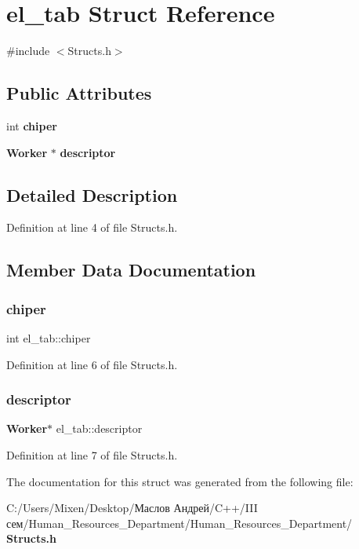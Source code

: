 \section{el\+\_\+tab Struct Reference}
\label{structel__tab}


{\ttfamily \#include $<$Structs.\+h$>$}

\subsection*{Public Attributes}
\begin{DoxyCompactItemize}
\item 
int \textbf{ chiper}
\item 
\textbf{ Worker} $\ast$ \textbf{ descriptor}
\end{DoxyCompactItemize}


\subsection{Detailed Description}


Definition at line 4 of file Structs.\+h.



\subsection{Member Data Documentation}
\mbox{\label{structel__tab_ad4b1e3306733818e62746b2d7cc81a28}} 
\subsubsection{chiper}
{\footnotesize\ttfamily int el\+\_\+tab\+::chiper}



Definition at line 6 of file Structs.\+h.

\mbox{\label{structel__tab_aa17cfde2ea3356e0210c34f67a3a18d5}} 
\subsubsection{descriptor}
{\footnotesize\ttfamily \textbf{ Worker}$\ast$ el\+\_\+tab\+::descriptor}



Definition at line 7 of file Structs.\+h.



The documentation for this struct was generated from the following file\+:\begin{DoxyCompactItemize}
\item 
C\+:/\+Users/\+Mixen/\+Desktop/Маслов Андрей/\+C++/\+I\+I\+I сем/\+Human\+\_\+\+Resources\+\_\+\+Department/\+Human\+\_\+\+Resources\+\_\+\+Department/\textbf{ Structs.\+h}\end{DoxyCompactItemize}
